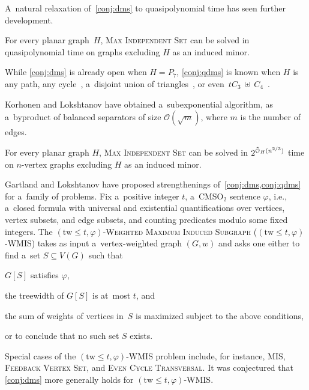\documentclass[a4paper,UKenglish,cleveref,autoref]{lipics-v2021}
\newcommand{\cmsot}{\textsf{CMSO$_2$}\xspace}
\newcommand{\mis}{\textsc{Max Independent Set}\xspace}
\newcommand{\smis}{\textsc{MIS}\xspace}
\newcommand{\Oh}{\mathcal{O}}
\newcommand\tw{\text{tw}}
\begin{document}
A~natural relaxation of~\cref{conj:dms} to quasipolynomial time has seen further development.

\begin{conjecture}\label{conj:qdms}
For every planar graph~$H$, \mis can be solved in quasipolynomial time on graphs excluding $H$ as an induced minor.
\end{conjecture}

While \cref{conj:dms} is already open when $H = P_7$, \cref{conj:qdms} is known when $H$ is any path, any cycle~\cite{Gartland21}, a~disjoint union of triangles~\cite{BonamyBDEGHTW24}, or even~$tC_3~\uplus~C_4$~\cite{BonnetDGTW26}.

Korhonen and Lokshtanov have obtained a~subexponential algorithm, as a~byproduct of balanced separators of size $\Oh(\sqrt m)$, where $m$ is the number of edges.

\begin{theorem}
  For every planar graph $H$, \mis can be solved in $2^{\Tilde{\Oh}_H(n^{2/3})}$ time on $n$-vertex graphs excluding $H$ as an induced minor.
\end{theorem}

Gartland and Lokshtanov have proposed strengthenings of~\cref{conj:dms,conj:qdms} for a~family of problems.
Fix a~positive integer $t$, a~\cmsot sentence $\varphi$, i.e., a~closed formula with universal and existential quantifications over vertices, vertex subsets, and edge subsets, and counting predicates modulo some fixed integers.
The $(\tw \leqslant t,\varphi)$-\textsc{Weighted Maximum Induced Subgraph} ($(\tw \leqslant t,\varphi)$-\textsc{WMIS}) takes as input a~vertex-weighted graph $(G,w)$ and asks one either to find a~set $S \subseteq V(G)$ such that
\begin{compactitem}
\item $G[S]$ satisfies $\varphi$,
\item the treewidth of $G[S]$ is at~most $t$, and
\item the sum of weights of vertices in~$S$ is maximized subject to the above conditions,
\end{compactitem}
or to conclude that no such set $S$ exists.

Special cases of the $(\tw \leqslant t,\varphi)$-\textsc{WMIS} problem include, for instance, \smis, \textsc{Feedback Vertex Set}, and \textsc{Even Cycle Transversal}.
It was conjectured that \cref{conj:dms} more generally holds for $(\tw \leqslant t,\varphi)$-\textsc{WMIS}.
\end{document}
